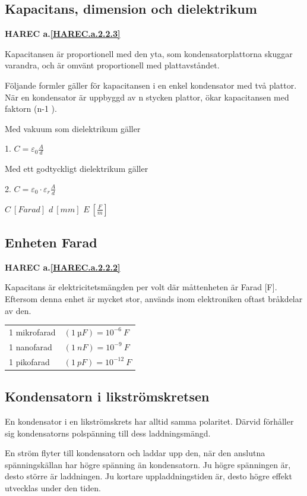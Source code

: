 \subsection{Kapacitans, dimension och dielektrikum}
\textbf{HAREC a.\ref{HAREC.a.2.2.3}\label{myHAREC.a.2.2.3}}

Kapacitansen är proportionell med den yta, som kondensatorplattorna skuggar
varandra, och är omvänt proportionell med plattavståndet.

Följande formler gäller för kapacitansen i en enkel kondensator med två
plattor. När en kondensator är uppbyggd av n stycken plattor, ökar kapacitansen
med faktorn (n-1 ).

Med vakuum som dielektrikum gäller

1. \(C = \varepsilon _0 \frac{A}{d}\)

Med ett godtyckligt dielektrikum gäller

2. \(C = \varepsilon _0 \cdot \varepsilon _r \frac{A}{d}\)

\(C\ [Farad]\) \(d\ [mm]\) \(E\ [\frac{F}{m}]\)

\subsection{Enheten Farad}
\textbf{HAREC a.\ref{HAREC.a.2.2.2}\label{myHAREC.a.2.2.2}}

Kapacitans är elektricitetsmängden per volt där måttenheten är Farad [F].
Eftersom denna enhet är mycket stor, används inom elektroniken oftast bråkdelar
av den.

\begin{tabular}{ll}
1 mikrofarad & \((1\ µF) = 10^{-6}\ F\) \\
1 nanofarad & \((1\ nF) = 10^{-9}\ F\) \\
1 pikofarad & \((1\ pF) = 10^{-12}\ F\) \\
\end{tabular}

\subsection{Kondensatorn i likströmskretsen}

En kondensator i en likströmskrets har alltid samma polaritet. Därvid förhåller
sig kondensatorns polspänning till dess laddningsmängd.

En ström flyter till kondensatorn och laddar upp den, när den anslutna
spänningskällan har högre spänning än kondensatorn. Ju högre spänningen är,
desto större är laddningen. Ju kortare uppladdningstiden är, desto högre effekt
utvecklas under den tiden.

